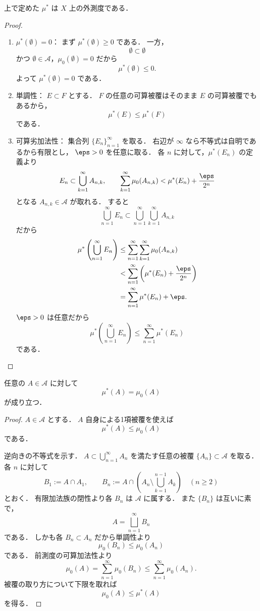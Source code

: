 \begin{proposition}
上で定めた $\mu^*$ は $X$ 上の外測度である．
\end{proposition}
\begin{proof}
\begin{enumerate}
    \item $\mu^*(\emptyset)=0$：
    まず $\mu^*(\emptyset)\ge 0$ である．
    一方，
    \[
    \emptyset \subset \emptyset
    \]
    かつ $\emptyset \in \mathcal A$，$\mu_0(\emptyset)=0$ だから
    \[
    \mu^*(\emptyset)\le 0.
    \]
    よって $\mu^*(\emptyset)=0$ である．

    \item 単調性：
    $E \subset F$ とする．
    $F$ の任意の可算被覆はそのまま $E$ の可算被覆でもあるから，
    \[
    \mu^*(E)\le \mu^*(F)
    \]
    である．

    \item 可算劣加法性：
    集合列 $\{E_n\}_{n=1}^{\infty}$ を取る．
    右辺が $\infty$ なら不等式は自明であるから有限とし，
    $\eps>0$ を任意に取る．
    各 $n$ に対して，$\mu^*(E_n)$ の定義より
    \[
    E_n\subset \bigcup_{k=1}^{\infty}A_{n,k},
    \qquad
    \sum_{k=1}^{\infty}\mu_0(A_{n,k})
    <
    \mu^*(E_n)+\frac{\eps}{2^n}
    \]
    となる $A_{n,k}\in\mathcal A$ が取れる．
    すると
    \[
    \bigcup_{n=1}^{\infty}E_n
    \subset
    \bigcup_{n=1}^{\infty}\bigcup_{k=1}^{\infty}A_{n,k}
    \]
    だから
    \begin{align*}
    \mu^*\left(\bigcup_{n=1}^{\infty}E_n\right)
    &\le
    \sum_{n=1}^{\infty}\sum_{k=1}^{\infty}\mu_0(A_{n,k}) \\
    &<
    \sum_{n=1}^{\infty}
    \left(
    \mu^*(E_n)+\frac{\eps}{2^n}
    \right) \\
    &=
    \sum_{n=1}^{\infty}\mu^*(E_n)+\eps.
    \end{align*}
    $\eps>0$ は任意だから
    \[
    \mu^*\left(\bigcup_{n=1}^{\infty}E_n\right)
    \le
    \sum_{n=1}^{\infty}\mu^*(E_n)
    \]
    である．
\end{enumerate}
\end{proof}

\begin{proposition}[前測度の拡張]
任意の $A \in \mathcal A$ に対して
\[
\mu^*(A)=\mu_0(A)
\]
が成り立つ．
\end{proposition}
\begin{proof}
$A \in \mathcal A$ とする．
$A$ 自身による1項被覆を使えば
\[
\mu^*(A)\le \mu_0(A)
\]
である．

逆向きの不等式を示す．
$A \subset \bigcup_{n=1}^{\infty}A_n$ を満たす任意の被覆 $\{A_n\}\subset\mathcal A$ を取る．
各 $n$ に対して
\[
B_1:=A\cap A_1,\qquad
B_n:=A\cap\left(A_n\setminus\bigcup_{k=1}^{n-1}A_k\right)\quad(n\ge 2)
\]
とおく．
有限加法族の閉性より各 $B_n$ は $\mathcal A$ に属する．
また $\{B_n\}$ は互いに素で，
\[
A=\bigsqcup_{n=1}^{\infty}B_n
\]
である．
しかも各 $B_n \subset A_n$ だから単調性より
\[
\mu_0(B_n)\le \mu_0(A_n)
\]
である．
前測度の可算加法性より
\[
\mu_0(A)
=
\sum_{n=1}^{\infty}\mu_0(B_n)
\le
\sum_{n=1}^{\infty}\mu_0(A_n).
\]
被覆の取り方について下限を取れば
\[
\mu_0(A)\le \mu^*(A)
\]
を得る．
\end{proof}

